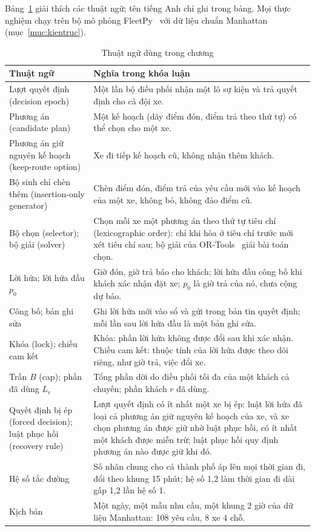 Bảng~\ref{bang:thuatngu} giải thích các thuật ngữ; tên tiếng Anh chỉ ghi trong bảng. Mọi thực nghiệm chạy trên
bộ mô phỏng FleetPy~\cite{engelhardt2026} với dữ liệu chuẩn Manhattan (mục~\ref{muc:kientruc}).

\begin{table}[htbp]
\centering
\caption[Thuật ngữ chính của phương pháp]{Thuật ngữ dùng trong chương}
\label{bang:thuatngu}
\small
\begin{tabular}{@{}p{4.3cm}p{10.5cm}@{}}
\toprule
\textbf{Thuật ngữ} & \textbf{Nghĩa trong khóa luận}\\
\midrule
Lượt quyết định (decision epoch) & Một lần bộ điều phối nhận một lô sự kiện và trả quyết định cho cả đội xe.\\
Phương án (candidate plan) & Một kế hoạch (dãy điểm đón, điểm trả theo thứ tự) có thể chọn cho một xe.\\
Phương án giữ nguyên kế hoạch (keep-route option) & Xe đi tiếp kế hoạch cũ, không nhận thêm khách.\\
Bộ sinh chỉ chèn thêm (insertion-only generator) & Chèn điểm đón, điểm trả của yêu cầu mới vào kế hoạch của
một xe, không bỏ, không đảo điểm cũ.\\
Bộ chọn (selector); bộ giải (solver) & Chọn mỗi xe một phương án theo thứ tự tiêu chí (lexicographic order):
chỉ khi hòa ở tiêu chí trước mới xét tiêu chí sau; bộ giải của OR-Tools~\cite{ortools} giải bài toán chọn.\\
Lời hứa; lời hứa đầu $p_0$ & Giờ đón, giờ trả báo cho khách; lời hứa đầu công bố khi khách xác nhận đặt xe;
$p_0$ là giờ trả của nó, chưa cộng dự báo.\\
Công bố; bản ghi sửa & Ghi lời hứa mới vào sổ và gửi trong bản tin quyết định; mỗi lần sau lời hứa đầu là một
bản ghi sửa.\\
Khóa (lock); chiều cam kết & Khóa: phần lời hứa không được đổi sau khi xác nhận. Chiều cam kết: thuộc tính của
lời hứa được theo dõi riêng, như giờ trả, việc đổi xe.\\
Trần $B$ (cap); phần đã dùng $L_r$ & Tổng phần dời do điều phối tối đa của một khách cả chuyến; phần khách $r$
đã dùng.\\
Quyết định bị ép (forced decision); luật phục hồi (recovery rule) & Lượt quyết định có ít nhất một xe bị ép:
luật lời hứa đã loại cả phương án giữ nguyên kế hoạch của xe, và xe chọn phương án được giữ nhờ luật phục hồi,
có ít nhất một khách được miễn trừ; luật phục hồi quy định phương án nào được giữ khi đó.\\
Hệ số tắc đường & Số nhân chung cho cả thành phố áp lên mọi thời gian đi, đổi theo khung 15 phút; hệ số 1,2 làm
thời gian đi dài gấp 1,2 lần hệ số 1.\\
Kịch bản & Một ngày, một mẫu nhu cầu, một khung 2 giờ của dữ liệu Manhattan: 108 yêu cầu, 8 xe 4 chỗ.\\
\bottomrule
\end{tabular}
\end{table}
